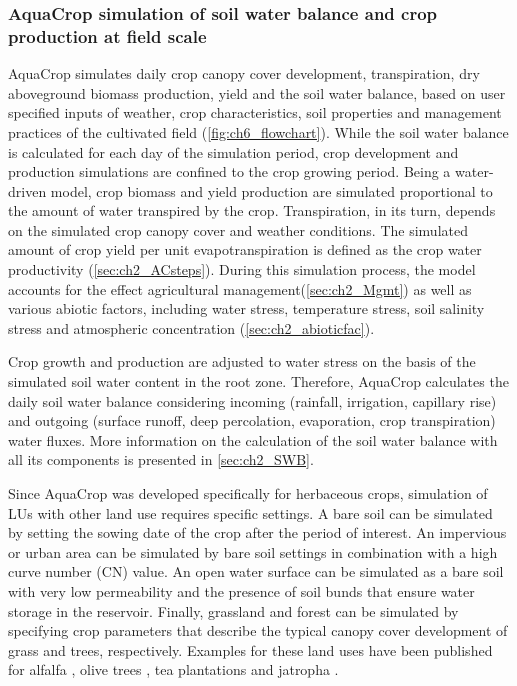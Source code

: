 \subsubsection{AquaCrop simulation of soil water balance and crop production at field scale}\label{sec:ch6_AC} 
AquaCrop simulates daily crop canopy cover development, transpiration, dry aboveground biomass production, yield and the soil water balance, based on user specified inputs of weather, crop characteristics, soil properties and management practices of the cultivated field (\autoref{fig:ch6_flowchart}). While the soil water balance is calculated for each day of the simulation period, crop development and production simulations are confined to the crop growing period. Being a water-driven model, crop biomass and yield production are simulated proportional to the amount of water transpired by the crop. Transpiration, in its turn, depends on the simulated crop canopy cover and weather conditions. The simulated amount of crop yield per unit evapotranspiration is defined as the crop water productivity (\autoref{sec:ch2_ACsteps}). During this  simulation process, the model accounts for the effect agricultural management(\autoref{sec:ch2_Mgmt}) as well as various abiotic factors, including water stress, temperature stress, soil salinity stress and atmospheric \COtwo concentration (\autoref{sec:ch2_abioticfac}). 

Crop growth and production are adjusted to water stress on the basis of the simulated soil water content in the root zone. Therefore, AquaCrop calculates the daily soil water balance considering incoming (rainfall, irrigation, capillary rise) and outgoing (surface runoff, deep percolation, evaporation, crop transpiration) water fluxes. More information on the calculation of the soil water balance with all its components is presented in \autoref{sec:ch2_SWB}.

Since AquaCrop was developed specifically for herbaceous crops, simulation of LUs with other land use requires specific settings. A bare soil can be simulated by setting the sowing date of the crop after the period of interest. An impervious or urban area can be simulated by bare soil settings in combination with a high curve number (CN) value. An open water surface can be simulated as a bare soil with very low permeability and the presence of soil bunds that ensure water storage in the reservoir. Finally, grassland and forest can be simulated by specifying crop parameters that describe the typical canopy cover development of grass and trees, respectively. Examples for these land uses have been published for alfalfa \parencite{kim2015}, olive trees \parencite{rallo2012}, tea plantations \parencite{elbehri2015} and jatropha \parencite{segerstedt2013}. 

